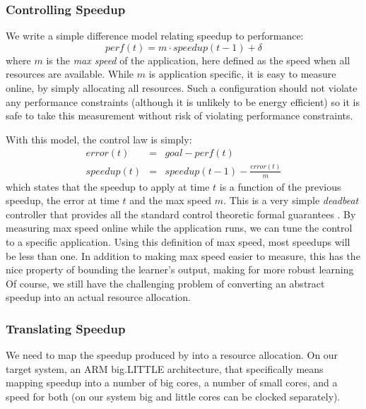 \subsubsection{Controlling Speedup}
We write a simple difference model relating speedup to performance:
\begin{equation}
  perf(t) = m \cdot speedup(t-1) + \delta \label{eqn:speedup}
\end{equation}
where $m$ is the \emph{max speed} of the application, here defined as
the speed when all resources are available.  While $m$ is application
specific, it is easy to measure online, by simply allocating all
resources. Such a configuration should not violate any performance
constraints (although it is unlikely to be energy efficient) so it is
safe to take this measurement without risk of violating performance
constraints.

With this model, the control law is simply:
\begin{eqnarray}
  error(t) &=& goal - perf(t) \label{eqn:speedup-error} \\
  speedup(t) &=& speedup(t-1) - \frac{error(t)}{m}
  \label{eqn:speedup-control}
\end{eqnarray}
which states that the speedup to apply at time $t$ is a function of
the previous speedup, the error at time $t$ and the max speed $m$.
This is a very simple \emph{deadbeat} controller that provides all the
standard control theoretic formal guarantees
\cite{controlhandbook,seec-scs2010}.  By measuring max speed online
while the application runs, we can tune the control to a specific
application.  Using this definition of max speed, most
speedups will be less than one.  In addition to making max speed
easier to measure, this has the nice property of bounding the
learner's output, making for more robust learning  Of
course, we still have the challenging problem of converting an
abstract speedup into an actual resource allocation.


\subsubsection{Translating Speedup}
We need to map the speedup produced by  into a
resource allocation.  On our target system, an ARM big.LITTLE
architecture, that specifically means mapping speedup into a number of
big cores, a number of small cores, and a speed for both (on our
system big and little cores can be clocked separately).

